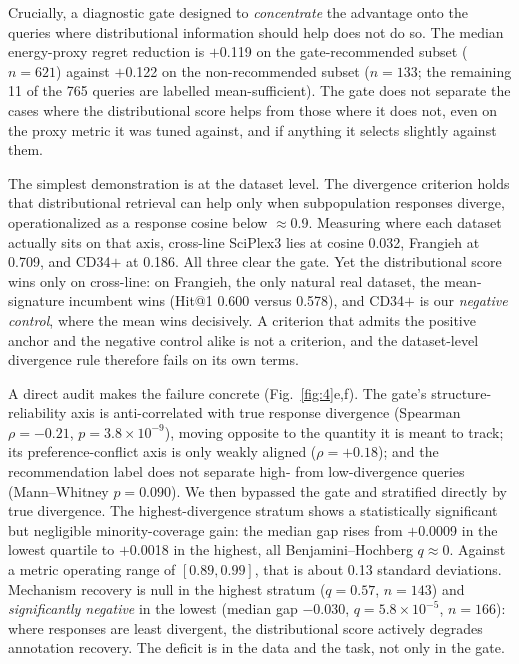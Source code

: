 \documentclass[11pt,letterpaper]{article}
\begin{document}
Crucially, a diagnostic gate designed to \textit{concentrate} the advantage onto the
queries where distributional information should help does not do so. The median
energy-proxy regret reduction is $+$0.119 on the gate-recommended subset ($n = 621$)
against $+$0.122 on the non-recommended subset ($n = 133$; the remaining 11 of the 765
queries are labelled mean-sufficient). The gate does not separate the cases where the
distributional score helps from those where it does not, even on the proxy metric it was tuned
against, and if anything it selects slightly against them.

The simplest demonstration is at the dataset level. The divergence criterion holds that
distributional retrieval can help only when subpopulation responses diverge,
operationalized as a response cosine below $\approx$0.9. Measuring where each dataset
actually sits on that axis, cross-line SciPlex3 lies at cosine 0.032, Frangieh
at 0.709, and CD34$+$ at 0.186. All three clear the gate. Yet the distributional score wins
only on cross-line: on Frangieh, the only natural real dataset, the mean-signature
incumbent wins (Hit@1 0.600 versus 0.578), and CD34$+$ is our \emph{negative control},
where the mean wins decisively. A criterion that admits the positive anchor and
the negative control alike is not a criterion, and the dataset-level divergence rule
therefore fails on its own terms.

A direct audit makes the failure concrete (Fig.~\ref{fig:4}e,f). The gate's
structure-reliability axis is anti-correlated with true response divergence (Spearman
$\rho = -0.21$, $p = 3.8\times10^{-9}$), moving opposite to the quantity it is meant to track;
its preference-conflict axis is only weakly aligned ($\rho = +0.18$); and the recommendation
label does not separate high- from low-divergence queries (Mann--Whitney $p = 0.090$).
We then bypassed the gate and stratified directly by true divergence. The highest-divergence
stratum shows a statistically significant but negligible minority-coverage gain: the median gap
rises from $+$0.0009 in the lowest quartile to $+$0.0018 in the highest, all Benjamini--Hochberg
$q \approx 0$. Against a metric operating range of $[0.89, 0.99]$, that is about 0.13 standard
deviations. Mechanism recovery is null in the highest stratum ($q = 0.57$, $n = 143$) and
\emph{significantly negative} in the lowest (median gap $-$0.030, $q = 5.8\times10^{-5}$,
$n = 166$): where responses are least divergent, the distributional score actively degrades annotation
recovery.
The deficit is in the data and the task, not only in the gate.
\end{document}

